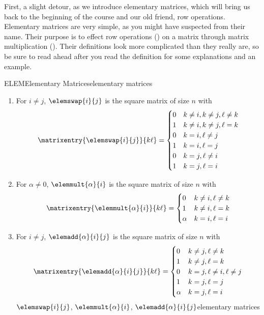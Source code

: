 %
First, a slight detour, as we introduce elementary matrices, which will bring us back to the beginning of the course and our old friend, row operations.
%
%
Elementary matrices are very simple, as you might have suspected from their name.  Their purpose is to effect row operations () on a matrix through matrix multiplication ().  Their definitions look more complicated than they really are, so be sure to read ahead after you read the definition for some explanations and an example.
%
\begin{definition}{ELEM}{Elementary Matrices}{elementary matrices}
\begin{enumerate}
\item For $i\neq j$, $\elemswap{i}{j}$ is the square matrix of size $n$ with
%
\begin{equation*}
\matrixentry{\elemswap{i}{j}}{k\ell}=
\begin{cases}
0 & k\neq i, k\neq j, \ell\neq k\\
1 & k\neq i, k\neq j, \ell=k\\
0 & k=i, \ell\neq j\\
1 & k=i, \ell=j\\
0 & k=j, \ell\neq i\\
1 & k=j, \ell=i
\end{cases}
\end{equation*}
%
\item For $\alpha\neq 0$, $\elemmult{\alpha}{i}$ is the square matrix of size $n$ with
%
\begin{equation*}
\matrixentry{\elemmult{\alpha}{i}}{k\ell}=
\begin{cases}
0        & k\neq i, \ell\neq k\\
1        & k\neq i, \ell=k\\
\alpha & k=i, \ell=i
\end{cases}
\end{equation*}
%
\item For $i\neq j$, $\elemadd{\alpha}{i}{j}$ is the square matrix of size $n$ with
%
\begin{equation*}
\matrixentry{\elemadd{\alpha}{i}{j}}{k\ell}=
\begin{cases}
0 & k\neq j, \ell\neq k\\
1 & k\neq j, \ell=k\\
0 & k=j, \ell\neq i, \ell\neq j\\
1 & k=j, \ell=j\\
\alpha & k=j, \ell=i\\
\end{cases}
\end{equation*}
%
{$\elemswap{i}{j}$, $\elemmult{\alpha}{i}$, $\elemadd{\alpha}{i}{j}$}{elementary matrices}
\end{enumerate}
\end{definition}
